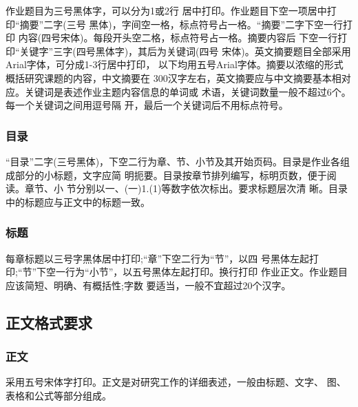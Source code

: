 \documentclass{THUThesis}
\begin{document}
作业题目为三号黑体字，可以分为1或2行 居中打印。作业题目下空一项居中打印“摘要”二字(三号 黑体)，字间空一格，标点符号占一格。“摘要”二字下空一行打印 内容(四号宋体)。每段开头空二格，标点符号占一格。摘要内容后 下空一行打印“关键字”三字(四号黑体字)，其后为关键词(四号 宋体)。英文摘要题目全部采用Arial字体，可分成1-3行居中打印， 以下均用五号Arial字体。摘要以浓缩的形式概括研究课题的内容，中文摘要在 300汉字左右，英文摘要应与中文摘要基本相对应。关键词是表述作业主题内容信息的单词或 术语，关键词数量一般不超过6个。每一个关键词之间用逗号隔 开，最后一个关键词后不用标点符号。

\subsubsection{目录}
“目录”二字(三号黑体)，下空二行为章、节、小节及其开始页码。目录是作业各组成部分的小标题，文字应简 明扼要。目录按章节排列编写，标明页数，便于阅读。章节、小 节分别以一、(一)1.(1)等数字依次标出。要求标题层次清 晰。目录中的标题应与正文中的标题一致。

\subsubsection{标题}
每章标题以三号字黑体居中打印;“章”下空二行为“节”，以四 号黑体左起打印;“节”下空一行为“小节”，以五号黑体左起打印。换行打印 作业正文。作业题目应该简短、明确、有概括性;字数 要适当，一般不宜超过20个汉字。

\subsection{正文格式要求}
\subsubsection{正文}
采用五号宋体字打印。正文是对研究工作的详细表述，一般由标题、文字、 图、表格和公式等部分组成。
\end{document}
